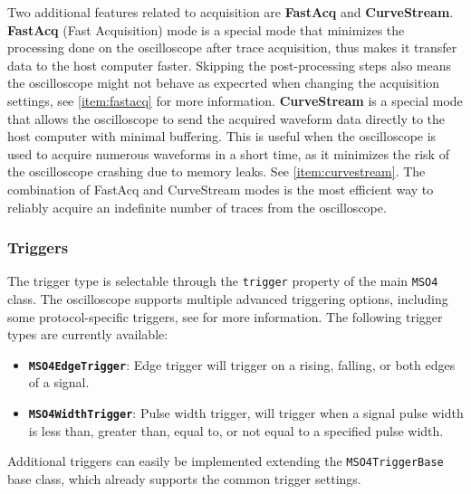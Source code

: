 \documentclass[a4paper,english,twoside,10pt]{article}
\begin{document}
Two additional features related to acquisition are \textbf{FastAcq} and \textbf{CurveStream}. \textbf{FastAcq} (Fast Acquisition) mode is a special mode that minimizes the processing done on the oscilloscope after trace acquisition, thus makes it transfer data to the host computer faster. Skipping the post-processing steps also means the oscilloscope might not behave as expecrted when changing the acquisition settings, see \autoref{item:fastacq} for more information.
\textbf{CurveStream} is a special mode that allows the oscilloscope to send the acquired waveform data directly to the host computer with minimal buffering. This is useful when the oscilloscope is used to acquire numerous waveforms in a short time, as it minimizes the risk of the oscilloscope crashing due to memory leaks. See \autoref{item:curvestream}.
The combination of FastAcq and CurveStream modes is the most efficient way to reliably acquire an indefinite number of traces from the oscilloscope.

\subsubsection{Triggers}
The trigger type is selectable through the \texttt{trigger} property of the main \texttt{MSO4} class. The oscilloscope supports multiple advanced triggering options, including some protocol-specific triggers, see \cite[p.~159]{tektronix:mso-progman}\cite[p.~121]{tektronix:mso-help} for more information. The following trigger types are currently available:
\begin{itemize}
	\item \textbf{\texttt{MSO4EdgeTrigger}}: Edge trigger will trigger on a rising, falling, or both edges of a signal.
	\item \textbf{\texttt{MSO4WidthTrigger}}: Pulse width trigger, will trigger when a signal pulse width is less than, greater than, equal to, or not equal to a specified pulse width.
\end{itemize}

Additional triggers can easily be implemented extending the \texttt{MSO4TriggerBase} base class, which already supports the common trigger settings.
\end{document}

